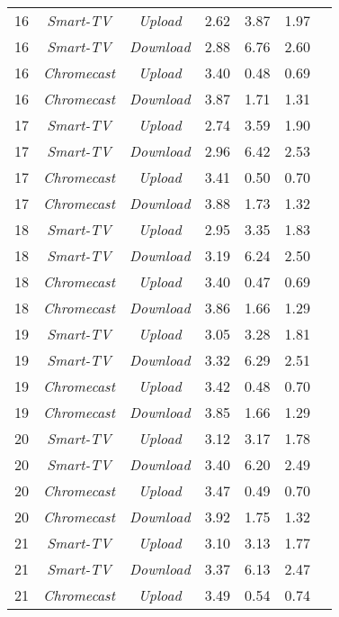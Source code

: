 \begin{longtable}{|c|c|c|c|c|c|c|}
    \hline
    16 & \textit{Smart-TV} & \textit{Upload} & 2.62 & 3.87 & 1.97 \\
    16 & \textit{Smart-TV} & \textit{Download} & 2.88 & 6.76 & 2.60 \\
    16 & \textit{Chromecast} & \textit{Upload} & 3.40 & 0.48 & 0.69 \\
    16 & \textit{Chromecast} & \textit{Download} & 3.87 & 1.71 & 1.31 \\
    \hline
    17 & \textit{Smart-TV} & \textit{Upload} & 2.74 & 3.59 & 1.90 \\
    17 & \textit{Smart-TV} & \textit{Download} & 2.96 & 6.42 & 2.53 \\
    17 & \textit{Chromecast} & \textit{Upload} & 3.41 & 0.50 & 0.70 \\
    17 & \textit{Chromecast} & \textit{Download} & 3.88 & 1.73 & 1.32 \\
    \hline
    18 & \textit{Smart-TV} & \textit{Upload} & 2.95 & 3.35 & 1.83 \\
    18 & \textit{Smart-TV} & \textit{Download} & 3.19 & 6.24 & 2.50 \\
    18 & \textit{Chromecast} & \textit{Upload} & 3.40 & 0.47 & 0.69 \\
    18 & \textit{Chromecast} & \textit{Download} & 3.86 & 1.66 & 1.29 \\
    \hline
    19 & \textit{Smart-TV} & \textit{Upload} & 3.05 & 3.28 & 1.81 \\
    19 & \textit{Smart-TV} & \textit{Download} & 3.32 & 6.29 & 2.51 \\
    19 & \textit{Chromecast} & \textit{Upload} & 3.42 & 0.48 & 0.70 \\
    19 & \textit{Chromecast} & \textit{Download} & 3.85 & 1.66 & 1.29 \\
    \hline
    20 & \textit{Smart-TV} & \textit{Upload} & 3.12 & 3.17 & 1.78 \\
    20 & \textit{Smart-TV} & \textit{Download} & 3.40 & 6.20 & 2.49 \\
    20 & \textit{Chromecast} & \textit{Upload} & 3.47 & 0.49 & 0.70 \\
    20 & \textit{Chromecast} & \textit{Download} & 3.92 & 1.75 & 1.32 \\
    \hline
    21 & \textit{Smart-TV} & \textit{Upload} & 3.10 & 3.13 & 1.77 \\
    21 & \textit{Smart-TV} & \textit{Download} & 3.37 & 6.13 & 2.47 \\
    21 & \textit{Chromecast} & \textit{Upload} & 3.49 & 0.54 & 0.74 \\

\end{longtable}
